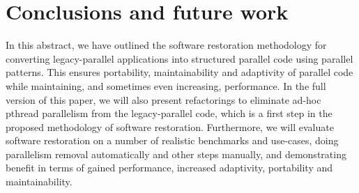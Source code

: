 \documentclass{llncs}
\begin{document}

\section{Conclusions and future work} \label{sec:Conclusions}
In this abstract, we have outlined the software restoration methodology for converting legacy-parallel applications into structured parallel code using parallel patterns. This ensures portability, maintainability and adaptivity of parallel code while maintaining, and sometimes even increasing, performance. In the full version of this paper, we will also present refactorings to eliminate ad-hoc pthread parallelism from the legacy-parallel code, which is a first step in the proposed methodology of software restoration. Furthermore, we will evaluate software restoration on a number of realistic benchmarks and use-cases, doing parallelism removal automatically and other steps manually, and demonstrating benefit in terms of gained performance, increased adaptivity, portability and maintainability.








\end{document}
